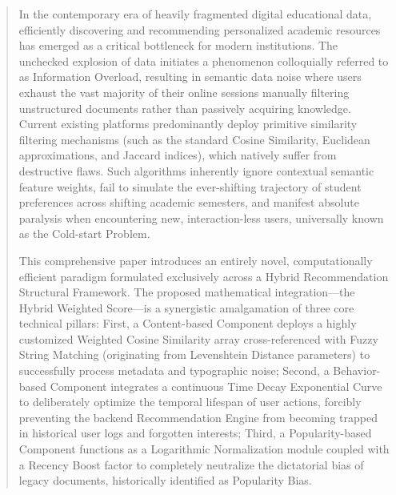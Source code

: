 \documentclass[journal]{IEEEtran}
\begin{document}
\begin{abstract}
In the contemporary era of heavily fragmented digital educational data, 
efficiently discovering and recommending personalized academic resources has emerged as a critical bottleneck for modern institutions. 
The unchecked explosion of data initiates a phenomenon colloquially referred to as Information Overload, 
resulting in semantic data noise where users exhaust the vast majority of their online sessions manually filtering unstructured documents rather than passively acquiring knowledge. 
Current existing platforms predominantly deploy primitive similarity filtering mechanisms 
(such as the standard Cosine Similarity, Euclidean approximations, and Jaccard indices), 
which natively suffer from destructive flaws. 
Such algorithms inherently ignore contextual semantic feature weights, 
fail to simulate the ever-shifting trajectory of student preferences across shifting academic semesters, 
and manifest absolute paralysis when encountering new, interaction-less users, universally known as the Cold-start Problem.

This comprehensive paper introduces an entirely novel, computationally efficient paradigm formulated exclusively across a Hybrid Recommendation Structural Framework. 
The proposed mathematical integration---the Hybrid Weighted Score---is a synergistic amalgamation of three core technical pillars: 
First, a Content-based Component deploys a highly customized Weighted Cosine Similarity array cross-referenced with Fuzzy String Matching 
(originating from Levenshtein Distance parameters) to successfully process metadata and typographic noise; 
Second, a Behavior-based Component integrates a continuous Time Decay Exponential Curve to deliberately optimize the temporal lifespan of user actions, 
forcibly preventing the backend Recommendation Engine from becoming trapped in historical user logs and forgotten interests; 
Third, a Popularity-based Component functions as a Logarithmic Normalization module coupled with a Recency Boost factor 
to completely neutralize the dictatorial bias of legacy documents, historically identified as Popularity Bias.


\end{abstract}
\end{document}

